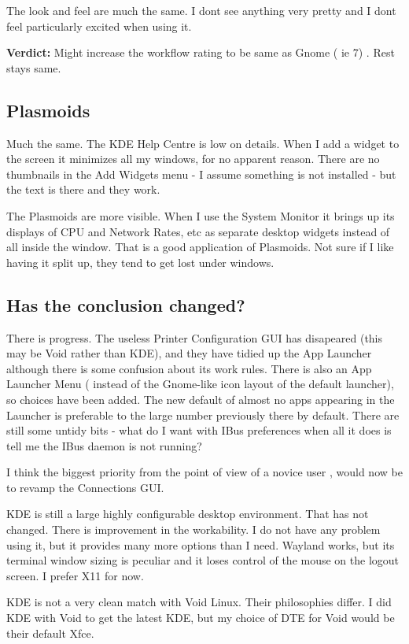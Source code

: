 \documentclass{article}  %
\begin{document}
The look and feel are much the same. I dont see anything very pretty and I dont feel particularly excited when using it. 

{\bf Verdict:} Might increase the workflow rating to be same as Gnome ( ie 7) . Rest stays same.

\subsection{Plasmoids}
 Much the same. The KDE Help Centre is low on details. When I add a widget to the screen it minimizes all my windows, for no apparent reason. There are no thumbnails in the Add Widgets menu - I assume something is not installed - but the text is there and they work. 

The Plasmoids are more visible. When I use the System Monitor it brings up its displays of CPU and Network Rates, etc as separate desktop widgets instead of all inside the window. That is a good application of Plasmoids. Not sure if I like having it split up, they tend to get lost under windows.

\subsection{Has the conclusion changed?}
There is progress.  The useless Printer Configuration GUI has disapeared (this may be Void rather than KDE), and they have tidied up the App Launcher although there is some confusion about its work rules. There is also an App Launcher Menu ( instead of the Gnome-like icon layout of the default launcher), so choices have been added. The new default of almost no apps appearing in the Launcher is preferable to the large number previously there by default. There are still some untidy bits - what do I want with IBus preferences when all it does is tell me the IBus daemon is not running?

I think the biggest priority from the point of view of a novice user , would now be to revamp the Connections GUI. 

KDE is still a large highly configurable desktop environment. That has not changed. There is improvement in the workability.  I do not have any problem using it, but it provides many more options than I need.  
Wayland works, but its terminal window sizing is peculiar and it loses control of the mouse on the logout screen. I prefer X11 for now.

KDE is not a very clean match with Void Linux.  Their philosophies differ. I did KDE with Void to get the latest KDE, but my choice of DTE for Void would be their default Xfce.
\end{document}
